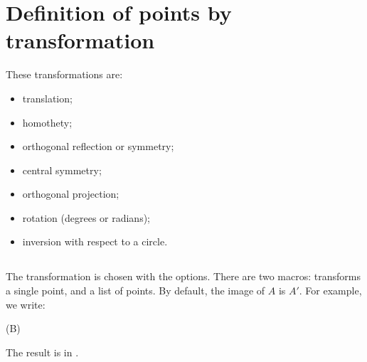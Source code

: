 \section{Definition of points by transformation}
These transformations are:

\begin{itemize}
   \item translation;
   \item homothety;
   \item orthogonal reflection or symmetry;
   \item central symmetry;
   \item orthogonal projection;
   \item rotation (degrees or radians);
   \item inversion with respect to a circle.
\end{itemize}

\subsection{}
The transformation is chosen with the options. There are two macros:  transforms a single point, and  a list of points. By default, the image of $A$ is $A'$. For example, we write:
\begin{tkzltxexample}[]
\tkzDefPointBy[translation= from A to A'](B) 
\end{tkzltxexample}
The result is in .

